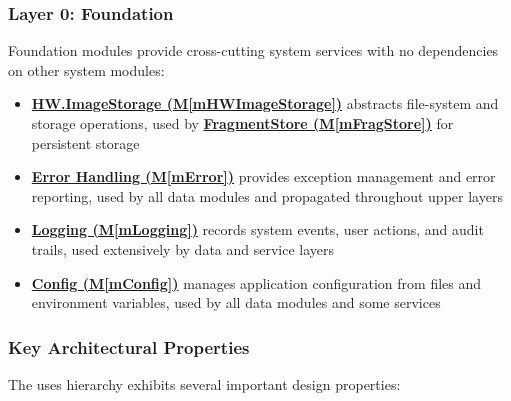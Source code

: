 \documentclass[12pt, titlepage]{article}
\newcommand{\mref}[1]{M\ref{#1}}
\begin{document}
\subsubsection{Layer 0: Foundation}
Foundation modules provide cross-cutting system services with no dependencies on other system modules:
\begin{itemize}
\item \hyperref[mHWImageStorage]{\textbf{HW.ImageStorage (\mref{mHWImageStorage})}} abstracts file-system and storage operations, used by \hyperref[mFragStore]{\textbf{FragmentStore (\mref{mFragStore})}} for persistent storage
\item \hyperref[mError]{\textbf{Error Handling (\mref{mError})}} provides exception management and error reporting, used by all data modules and propagated throughout upper layers
\item \hyperref[mLogging]{\textbf{Logging (\mref{mLogging})}} records system events, user actions, and audit trails, used extensively by data and service layers
\item \hyperref[mConfig]{\textbf{Config (\mref{mConfig})}} manages application configuration from files and environment variables, used by all data modules and some services
\end{itemize}

\subsubsection{Key Architectural Properties}

The uses hierarchy exhibits several important design properties:
\end{document}
